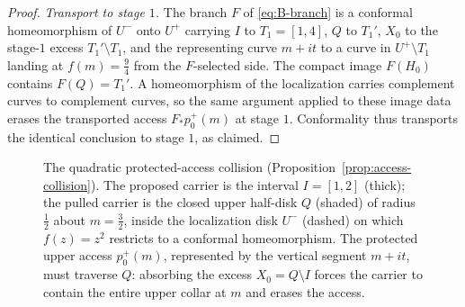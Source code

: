 \documentclass[11pt,reqno]{amsart}
\theoremstyle{definition}
\theoremstyle{remark}
\begin{document}
\begin{proof}
\emph{Transport to stage $1$.}
The branch $F$ of \eqref{eq:B-branch} is a conformal homeomorphism of
$U^{-}$ onto $U^{+}$ carrying $I$ to $T_1=[1,4]$, $Q$ to $T_1'$, $X_0$ to the
stage-$1$ excess $T_1'\setminus T_1$, and the representing curve $m+it$ to a
curve in $U^{+}\setminus T_1$ landing at $f(m)=\tfrac94$ from the
$F$-selected side.  The compact image $F(H_0)$ contains
$F(Q)=T_1'$.  A homeomorphism of the localization carries complement
curves to complement curves, so the same argument applied to these image data
erases the transported access $F_{*}p_0^{+}(m)$ at stage $1$. Conformality
thus transports the identical conclusion to stage $1$, as claimed.
\end{proof}

\begin{figure}[ht]
\centering
{}
\caption{The quadratic protected-access collision
(Proposition~\ref{prop:access-collision}). The proposed carrier is the
interval $I=[1,2]$ (thick); the pulled carrier is the closed upper half-disk
$Q$ (shaded) of radius $\tfrac12$ about $m=\tfrac32$, inside the localization
disk $U^{-}$ (dashed) on which $f(z)=z^{2}$ restricts to a conformal
homeomorphism. The protected upper access $p_0^{+}(m)$, represented by the
vertical segment $m+it$, must traverse $Q$: absorbing the excess
$X_0=Q\setminus I$ forces the carrier to contain the entire upper collar at
$m$ and erases the access.}
\label{fig:access-collision}
\end{figure}
\end{document}
